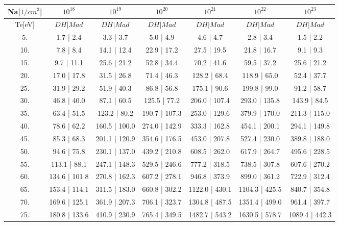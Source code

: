 \begin{tabular}{|c||c|c|c|c|c|c|}
\hline
Na[$1/cm^3$] & $10^{18}$ & $10^{19}$ & $10^{20}$ & $10^{21}$ & $10^{22}$ & $10^{23}$\tabularnewline
\hline
Te[eV] & $DH | Mad$ & $DH | Mad$ & $DH | Mad$ & $DH | Mad$ & $DH | Mad$ & $DH | Mad$\tabularnewline
\hline
\hline
   5. &      1.7 |     2.4 &      3.3 |     3.7 &      5.0 |     4.9 &      4.6 |     4.7 &      2.8 |     3.4 &      1.5 |     2.2\tabularnewline
\hline
  10. &      7.8 |     8.4 &     14.1 |    12.4 &     22.9 |    17.2 &     27.5 |    19.5 &     21.8 |    16.7 &      9.1 |     9.3\tabularnewline
\hline
  15. &      9.7 |    11.1 &     25.6 |    21.2 &     52.8 |    34.4 &     70.2 |    41.6 &     59.5 |    37.2 &     25.6 |    21.2\tabularnewline
\hline
  20. &     17.0 |    17.8 &     31.5 |    26.8 &     71.4 |    46.3 &    128.2 |    68.4 &    118.9 |    65.0 &     52.4 |    37.7\tabularnewline
\hline
  25. &     31.9 |    29.2 &     51.9 |    40.3 &     86.8 |    56.8 &    175.1 |    90.6 &    199.8 |    99.0 &     91.2 |    58.7\tabularnewline
\hline
  30. &     46.8 |    40.0 &     87.1 |    60.5 &    125.5 |    77.2 &    206.0 |   107.4 &    293.0 |   135.8 &    143.9 |    84.5\tabularnewline
\hline
  35. &     63.4 |    51.5 &    123.2 |    80.2 &    190.7 |   107.3 &    253.0 |   129.6 &    379.9 |   170.0 &    211.3 |   115.0\tabularnewline
\hline
  40. &     78.6 |    62.2 &    160.5 |   100.0 &    274.0 |   142.9 &    333.3 |   162.8 &    454.1 |   200.1 &    294.1 |   149.8\tabularnewline
\hline
  45. &     85.3 |    68.3 &    201.1 |   120.9 &    354.6 |   176.5 &    453.0 |   207.8 &    527.4 |   230.0 &    389.8 |   188.0\tabularnewline
\hline
  50. &     94.6 |    75.8 &    230.1 |   137.0 &    439.2 |   210.8 &    608.5 |   262.0 &    617.9 |   264.7 &    495.6 |   228.5\tabularnewline
\hline
  55. &    113.1 |    88.1 &    247.1 |   148.3 &    529.5 |   246.6 &    777.2 |   318.5 &    738.5 |   307.8 &    607.6 |   270.2\tabularnewline
\hline
  60. &    134.6 |   101.8 &    270.8 |   162.3 &    607.2 |   278.1 &    946.8 |   373.9 &    899.0 |   361.2 &    722.9 |   312.4\tabularnewline
\hline
  65. &    153.4 |   114.1 &    311.5 |   183.0 &    660.8 |   302.2 &   1122.0 |   430.1 &   1104.3 |   425.5 &    840.7 |   354.8\tabularnewline
\hline
  70. &    169.6 |   125.1 &    361.9 |   207.3 &    706.1 |   323.7 &   1304.8 |   487.5 &   1351.4 |   499.0 &    961.4 |   397.7\tabularnewline
\hline
  75. &    180.8 |   133.6 &    410.9 |   230.9 &    765.4 |   349.5 &   1482.7 |   543.2 &   1630.5 |   578.7 &   1089.4 |   442.3\tabularnewline

\end{tabular}
